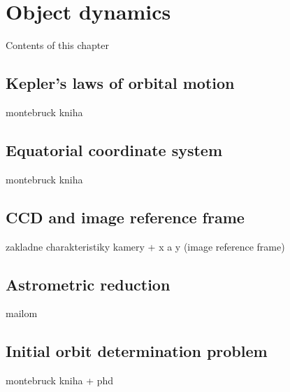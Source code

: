 \chapter{Object dynamics}\label{chap:object_dynamics}

	Contents of this chapter 

\section{Kepler's laws of orbital motion}\label{sec:kepler}
montebruck kniha

\section{Equatorial coordinate system}\label{sec:ra_dec}
montebruck kniha

\section{CCD and image reference frame}\label{sec:ccd}
zakladne charakteristiky kamery + x a y (image reference frame)

\section{Astrometric reduction}\label{sec:proc_seg_reduc}
mailom

\section{Initial orbit determination problem}\label{sec:init_orbit_det}
montebruck kniha + phd